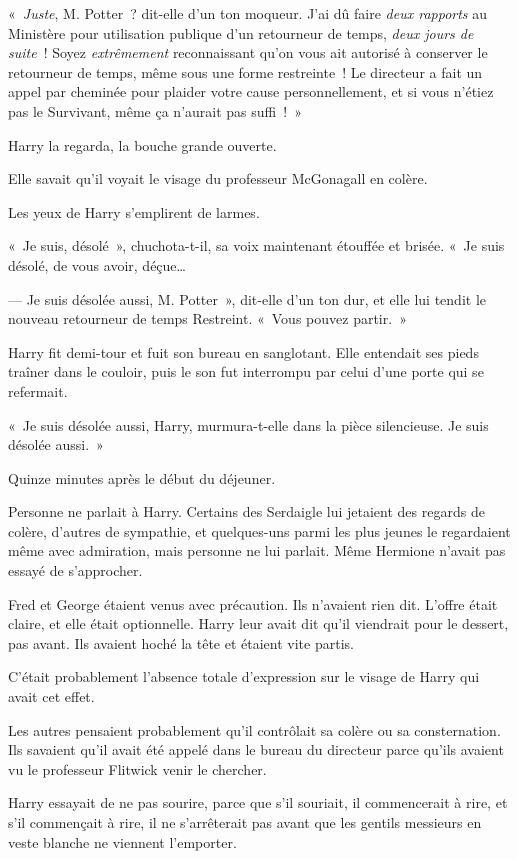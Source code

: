 «~\emph{Juste}, M. Potter~? dit-elle d'un ton moqueur.
J'ai dû faire \emph{deux rapports} au Ministère pour utilisation publique d'un retourneur de temps, \emph{deux jours de suite}~!
Soyez \emph{extrêmement} reconnaissant qu'on vous ait autorisé à conserver le retourneur de temps, même sous une forme restreinte~!
Le directeur a fait un appel par cheminée pour plaider votre cause personnellement, et si vous n'étiez pas le Survivant, même ça n'aurait pas suffi~!~»

Harry la regarda, la bouche grande ouverte.

Elle savait qu'il voyait le visage du professeur McGonagall en colère.

Les yeux de Harry s'emplirent de larmes.

«~Je suis, désolé~», chuchota-t-il, sa voix maintenant étouffée et brisée.
«~Je suis désolé, de vous avoir, déçue…

--- Je suis désolée aussi, M. Potter~», dit-elle d'un ton dur, et elle lui tendit le nouveau retourneur de temps Restreint.
«~Vous pouvez partir.~»

Harry fit demi-tour et fuit son bureau en sanglotant.
Elle entendait ses pieds traîner dans le couloir, puis le son fut interrompu par celui d'une porte qui se refermait.

«~Je suis désolée aussi, Harry, murmura-t-elle dans la pièce silencieuse.
Je suis désolée aussi.~»

\later

Quinze minutes après le début du déjeuner.

Personne ne parlait à Harry.
Certains des Serdaigle lui jetaient des regards de colère, d'autres de sympathie, et quelques-uns parmi les plus jeunes le regardaient même avec admiration, mais personne ne lui parlait.
Même Hermione n'avait pas essayé de s'approcher.

Fred et George étaient venus avec précaution.
Ils n'avaient rien dit.
L'offre était claire, et elle était optionnelle.
Harry leur avait dit qu'il viendrait pour le dessert, pas avant.
Ils avaient hoché la tête et étaient vite partis.

C'était probablement l'absence totale d'expression sur le visage de Harry qui avait cet effet.

Les autres pensaient probablement qu'il contrôlait sa colère ou sa consternation.
Ils savaient qu'il avait été appelé dans le bureau du directeur parce qu'ils avaient vu le professeur Flitwick venir le chercher.

Harry essayait de ne pas sourire, parce que s'il souriait, il commencerait à rire, et s'il commençait à rire, il ne s'arrêterait pas avant que les gentils messieurs en veste blanche ne viennent l'emporter.

